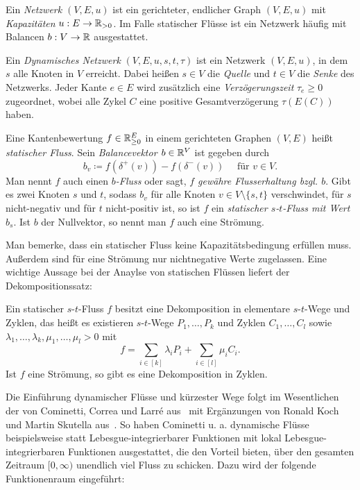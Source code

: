 \begin{definition}
	Ein \emph{Netzwerk $(V, E, u)$} ist ein gerichteter, endlicher Graph $(V, E, u)$ mit \emph{Kapazitäten} $u: E \to \mathbb{R}_{>0}$.
	Im Falle statischer Flüsse ist ein Netzwerk häufig mit Balancen $b:V\to\mathbb{R}$ ausgestattet.
	
	Ein \emph{Dynamisches Netzwerk} $(V, E, u, s, t, \tau)$ ist ein Netzwerk $(V, E, u)$, in dem $s$ alle Knoten in $V$ erreicht.
	Dabei heißen $s\in V$ die \emph{Quelle} und $t\in V$ die \emph{Senke} des Netzwerks.
	Jeder Kante $e\in E$ wird zusätzlich eine \emph{Verzögerungszeit} $\tau_e\geq 0$ zugeordnet, wobei alle Zykel $C$ eine positive Gesamtverzögerung $\tau(E(C))$ haben.
\end{definition}
\begin{definition}
	Eine Kantenbewertung $f\in\mathbb{R}_{\geq 0}^E$ in einem gerichteten Graphen $(V, E)$ heißt \emph{statischer Fluss}.
	Sein \emph{Balancevektor $b\in \mathbb{R}^V$} ist gegeben durch
	\[ b_v \coloneq f(\delta^+(v)) - f(\delta^-(v)) \text{~~~ für $v\in V$}. \]
	Man nennt $f$ auch einen \emph{$b$-Fluss} oder sagt, \emph{$f$ gewähre Flusserhaltung bzgl. $b$}.
	Gibt es zwei Knoten $s$ und $t$, sodass $b_v$
	für alle Knoten $v\in V\setminus\{ s, t \}$ verschwindet, für $s$ nicht-negativ und für $t$ nicht-positiv ist, so ist $f$ ein \emph{statischer $s$-$t$-Fluss mit Wert $b_s$}.
	Ist $b$ der Nullvektor, so nennt man $f$ auch eine Strömung.
\end{definition}

Man bemerke, dass ein statischer Fluss keine Kapazitätsbedingung erfüllen muss.
Außerdem sind für eine Strömung nur nichtnegative Werte zugelassen.
Eine wichtige Aussage bei der Anaylse von statischen Flüssen liefert der Dekompositionssatz:
\begin{theorem}[Dekompositionssatz]\label{thm-decomposition}
	Ein statischer $s$-$t$-Fluss $f$ besitzt eine Dekomposition in elementare $s$-$t$-Wege und Zyklen, das heißt es existieren $s$-$t$-Wege $P_1,\dots,P_k$ und Zyklen $C_1, \dots, C_l$ sowie $\lambda_1,\dots,\lambda_k,\mu_1,\dots,\mu_l > 0$ mit \[
		f = \sum_{i\in[k]}\lambda_i P_i + \sum_{i\in[l]} \mu_i C_i.
	\]
	Ist $f$ eine Strömung, so gibt es eine Dekomposition in Zyklen.
\end{theorem}

Die Einführung dynamischer Flüsse und kürzester Wege folgt im Wesentlichen der von Cominetti, Correa und Larré aus~\cite{Cominetti2015} mit Ergänzungen von Ronald Koch und Martin Skutella aus~\cite{Koch2011}.
So haben Cominetti u. a. dynamische Flüsse beispielsweise statt Lebesgue-integrierbarer Funktionen mit lokal Lebesgue-integrierbaren Funktionen ausgestattet, die den Vorteil bieten, über den gesamten Zeitraum $[0, \infty)$ unendlich viel Fluss zu schicken.
Dazu wird der folgende Funktionenraum eingeführt:


